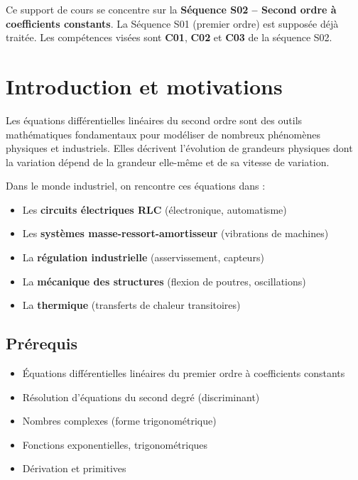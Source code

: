 \documentclass[a4paper,11pt]{article}
\begin{document}
\vspace{0.5cm}

\begin{remarque}
Ce support de cours se concentre sur la \textbf{Séquence S02 -- Second ordre à coefficients constants}. La Séquence S01 (premier ordre) est supposée déjà traitée. Les compétences visées sont \textbf{C01}, \textbf{C02} et \textbf{C03} de la séquence S02.
\end{remarque}

\newpage

\tableofcontents
\newpage

\section{Introduction et motivations}

Les équations différentielles linéaires du second ordre sont des outils mathématiques fondamentaux pour modéliser de nombreux phénomènes physiques et industriels. Elles décrivent l'évolution de grandeurs physiques dont la variation dépend de la grandeur elle-même et de sa vitesse de variation.

\begin{remarque}
Dans le monde industriel, on rencontre ces équations dans :
\begin{itemize}
  \item Les \textbf{circuits électriques RLC} (électronique, automatisme)
  \item Les \textbf{systèmes masse-ressort-amortisseur} (vibrations de machines)
  \item La \textbf{régulation industrielle} (asservissement, capteurs)
  \item La \textbf{mécanique des structures} (flexion de poutres, oscillations)
  \item La \textbf{thermique} (transferts de chaleur transitoires)
\end{itemize}
\end{remarque}

\subsection{Prérequis}
\begin{itemize}
  \item Équations différentielles linéaires du premier ordre à coefficients constants
  \item Résolution d'équations du second degré (discriminant)
  \item Nombres complexes (forme trigonométrique)
  \item Fonctions exponentielles, trigonométriques
  \item Dérivation et primitives
\end{itemize}
\end{document}
